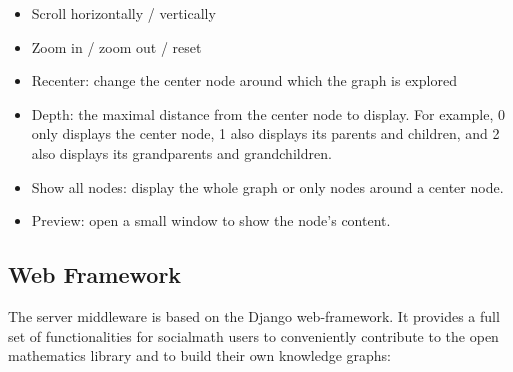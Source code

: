 \documentclass{acm_proc_article-sp}
\begin{document}
\begin{itemize}
\item Scroll horizontally / vertically
\item Zoom in / zoom out / reset
\item Recenter: change the center node around which the graph is explored
\item Depth: the maximal distance from the center node to display. 
For example, 0 only displays the center node, 1 also displays its parents and children, and 2 also displays its grandparents and grandchildren.
\item Show all nodes: display the whole graph or only nodes around a center node.
\item Preview: open a small window to show the node's content.
\end{itemize}
\subsection{Web Framework}
The server middleware is based on the Django web-framework. It provides a full set of functionalities for socialmath users to conveniently contribute to the open mathematics library and to build their own knowledge graphs:
\end{document}
